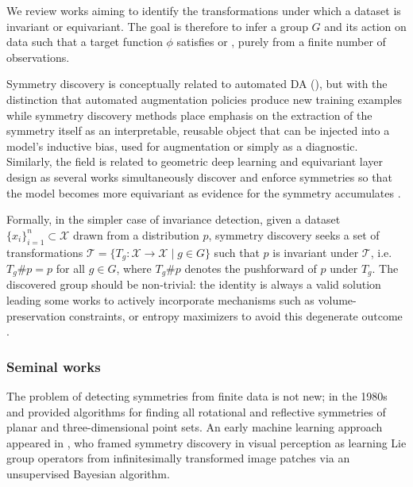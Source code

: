 \documentclass[mathematics,review,submit,moreauthors]{Definitions/mdpi}
\begin{document}
We review works aiming to identify the transformations under which a dataset is invariant or equivariant.
The goal is therefore to infer a group $G$ and its action on data such that a target function $\phi$ satisfies  or , purely from a finite number of observations.

Symmetry discovery is conceptually related to automated DA (), but with the distinction that automated augmentation policies produce new training examples while symmetry discovery methods place emphasis on the extraction of the symmetry itself as an interpretable, reusable object that can be injected into a model's inductive bias, used for augmentation or simply as a diagnostic.
Similarly, the field is related to geometric deep learning and equivariant layer design as several works simultaneously discover and enforce symmetries so that the model becomes more equivariant as evidence for the symmetry accumulates \citep{benton2020anips,ouderaa2022,otto2025,escriche2025}.

Formally, in the simpler case of invariance detection, given a dataset $\{x_i\}_{i=1}^n \subset \mathcal{X}$ drawn from a distribution $p$, symmetry discovery seeks a set of transformations $\mathcal{T} = \{T_g : \mathcal{X} \to \mathcal{X} \mid g \in G\}$ such that $p$ is invariant under $\mathcal{T}$, i.e.\ $T_g \# p = p$ for all $g \in G$, where $T_g \# p$ denotes the pushforward of $p$ under $T_g$.
The discovered group should be non-trivial: the identity is always a valid solution leading some works to actively incorporate mechanisms such as volume-preservation constraints, or entropy maximizers to avoid this degenerate outcome \citep{benton2020anips,yang2023p4icml,escriche2025}.
 
\subsubsection{Seminal works}
The problem of detecting symmetries from finite data is not new; in the 1980s \citet{highnam1985} and \citet{wolter1985tvc} provided algorithms for finding all rotational and reflective symmetries of planar and three-dimensional point sets.
An early machine learning approach appeared in \citet{rao1998anips}, who framed symmetry discovery in visual perception as learning Lie group operators from infinitesimally transformed image patches via an unsupervised Bayesian algorithm.
\end{document}
